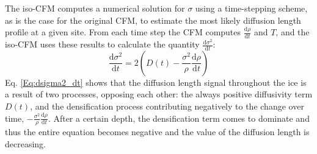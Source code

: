\documentclass[../../CompleteThesis/Complete_1stDraft.tex]{subfiles}
\begin{document}
The iso-CFM computes a numerical solution for $\sigma$ using a time-stepping scheme, as is the case for the original CFM, to estimate the most likely diffusion length profile at a given site. From each time step the CFM computes $\frac{\text{d}\rho}{\text{d}t}$ and $T$, and the iso-CFM uses these results to calculate the quantity $\frac{\text{d}\sigma^2}{\text{d}t}$:
\begin{equation}
	\frac{\text{d}\sigma^2}{\text{d}t} = 2\left(D(t) - \frac{\sigma^2}{\rho}\frac{\text{d}\rho}{\text{d}t}\right)
	\label{Eq:dsigma2_dt}
\end{equation}
Eq. \ref{Eq:dsigma2_dt} shows that the diffusion length signal throughout the ice is a result of two processes, opposing each other: the always positive diffusivity term $D(t)$, and the densification process contributing negatively to the change over time, $-\frac{\sigma^2}{\rho}\frac{\text{d}\rho}{\text{d}t}$.  After a certain depth, the densification term comes to dominate and thus the entire equation becomes negative and the value of the diffusion length is decreasing.
\end{document}
